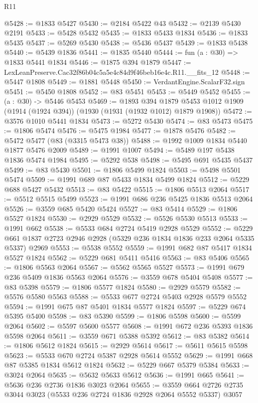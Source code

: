 \begin{lexlean}{R11}
\begin{coremodule}
@5428 := @1833 @5427
@5430 := @2184 @5422 @43
@5432 := @2139 @5430 @2191
@5433 := @5428 @5432
@5435 := @1833 @5433 @1834
@5436 := @1833 @5435
@5437 := @5269 @5430
@5438 := @5436 @5437
@5439 := @1833 @5438
@5440 := @5439 @1836
@5441 := @1835 @5440
@5444 := fun (a : @30) => @1833 @5441 @1834
@5446 := @1875 @394 @1879
@5447 := LexLeanPreserve.Cac32f86b04c5a5e4c84d9f46beb16e4c.R11.__fits_12
@5448 := @5447 @1808
@5449 := @1881 @5448
@5450 := VerdantEngine.ScalarF32.sign
@5451 := @5450 @1808
@5452 := @83 @5451
@5453 := @5449 @5452
@5455 := (a : @30) -> @5446 @5453
@5469 := @1893
    @394
    @1879
    @5453
    @1012
    @1909
    (@1914 (@1924 @394))
    (@1930 (@1931 (@1932 @1012) @1879 @1908))
@5472 := @3576 @1010 @5441 @1834
@5473 := @5272 @5430
@5474 := @83 @5473
@5475 := @1806 @5474
@5476 := @5475 @1984
@5477 := @1878 @5476
@5482 := @5472 @5477 (@83 (@3315 @5473 @38))
@5488 := @1992 @1009 @1834 @5440 @1877 @5476 @2009
@5489 := @1991 @1007
@5494 := @5489 @197 @5438 @1836 @5474 @1984
@5495 := @5292 @538
@5498 := @5495 @691 @5435 @5437
@5499 := @83 @5430
@5501 := @1806 @5499 @1824
@5503 := @5498 @5501 @5474
@5509 := @1991 @689 @87 @5433 @1834 @5499 @1824
@5512 := @5229 @688 @5427 @5432
@5513 := @83 @5422
@5515 := @1806 @5513 @2064
@5517 := @5512 @5515 @5499
@5523 := @1991 @686 @236 @5425 @1836 @5513 @2064
@5526 := @3559 @685 @5420 @5424
@5527 := @83 @5414
@5529 := @1806 @5527 @1824
@5530 := @2929 @5529
@5532 := @5526 @5530 @5513
@5533 := @1991 @662
@5538 := @5533 @684 @2724 @5419 @2928 @5529
@5552 := @5229 @661 @1837 @2723 @2946 @2928 (@5329 @236 @1834 @1836 @233 @2064 @5335 @5337) @2969
@5553 := @5538 @5552
@5559 := @1991 @682 @87 @5417 @1834 @5527 @1824
@5562 := @5229 @681 @5411 @5416
@5563 := @83 @5406
@5565 := @1806 @5563 @2064
@5567 := @5562 @5565 @5527
@5573 := @1991 @679 @236 @5409 @1836 @5563 @2064
@5576 := @3559 @678 @5404 @5408
@5577 := @83 @5398
@5579 := @1806 @5577 @1824
@5580 := @2929 @5579
@5582 := @5576 @5580 @5563
@5588 := @5533 @677 @2724 @5403 @2928 @5579 @5552
@5594 := @1991 @675 @87 @5401 @1834 @5577 @1824
@5597 := @5229 @674 @5395 @5400
@5598 := @83 @5390
@5599 := @1806 @5598
@5600 := @5599 @2064
@5602 := @5597 @5600 @5577
@5608 := @1991 @672 @236 @5393 @1836 @5598 @2064
@5611 := @3559 @671 @5388 @5392
@5612 := @83 @5382
@5614 := @1806 @5612 @1824
@5615 := @2929 @5614
@5617 := @5611 @5615 @5598
@5623 := @5533 @670 @2724 @5387 @2928 @5614 @5552
@5629 := @1991 @668 @87 @5385 @1834 @5612 @1824
@5632 := @5229 @667 @5379 @5384
@5633 := @3024 @2064
@5635 := @5632 @5633 @5612
@5636 := @1991 @665
@5641 := @5636 @236 @2736 @1836 @3023 @2064
@5655 := @3559 @664 @2726 @2735 @3044 @3023 (@5533 @236 @2724 @1836 @2928 @2064 @5552 @5337) @3057

\end{coremodule}
\end{lexlean}
